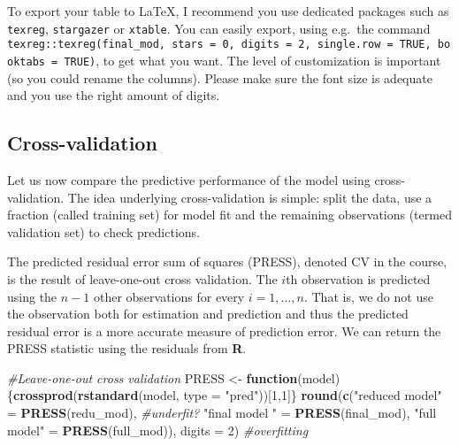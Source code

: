 \documentclass[]{book}
\newenvironment{Shaded}{\begin{snugshade}}{\end{snugshade}}
\newcommand{\CommentTok}[1]{\textcolor[rgb]{0.56,0.35,0.01}{\textit{#1}}}
\newcommand{\ControlFlowTok}[1]{\textcolor[rgb]{0.13,0.29,0.53}{\textbf{#1}}}
\newcommand{\DataTypeTok}[1]{\textcolor[rgb]{0.13,0.29,0.53}{#1}}
\newcommand{\DecValTok}[1]{\textcolor[rgb]{0.00,0.00,0.81}{#1}}
\newcommand{\KeywordTok}[1]{\textcolor[rgb]{0.13,0.29,0.53}{\textbf{#1}}}
\newcommand{\NormalTok}[1]{#1}
\newcommand{\StringTok}[1]{\textcolor[rgb]{0.31,0.60,0.02}{#1}}
\theoremstyle{definition}
\theoremstyle{definition}
\theoremstyle{definition}
\theoremstyle{remark}
\begin{document}
To export your table to \LaTeX, I recommend you use dedicated packages
such as \texttt{texreg}, \texttt{stargazer} or \texttt{xtable}. You can
easily export, using e.g.~the command
\texttt{texreg::texreg(final\_mod,\ stars\ =\ 0,\ digits\ =\ 2,\ single.row\ =\ TRUE,\ booktabs\ =\ TRUE)},
to get what you want. The level of customization is important (so you
could rename the columns). Please make sure the font size is adequate
and you use the right amount of digits.

\hypertarget{cross-validation}{%
\subsection{Cross-validation}\label{cross-validation}}

Let us now compare the predictive performance of the model using
cross-validation. The idea underlying cross-validation is simple: split
the data, use a fraction (called training set) for model fit and the
remaining observations (termed validation set) to check predictions.

The predicted residual error sum of squares (PRESS), denoted
\(\mathrm{CV}\) in the course, is the result of leave-one-out cross
validation. The \(i\)th observation is predicted using the \(n-1\) other
observations for every \(i=1, \ldots, n\). That is, we do not use the
observation both for estimation and prediction and thus the predicted
residual error is a more accurate measure of prediction error. We can
return the PRESS statistic using the residuals from \textbf{R}.

\begin{Shaded}
\begin{Highlighting}[]
\CommentTok{#Leave-one-out cross validation}
\NormalTok{PRESS <-}\StringTok{ }\ControlFlowTok{function}\NormalTok{(model)\{}\KeywordTok{crossprod}\NormalTok{(}\KeywordTok{rstandard}\NormalTok{(model, }\DataTypeTok{type =} \StringTok{"pred"}\NormalTok{))[}\DecValTok{1}\NormalTok{,}\DecValTok{1}\NormalTok{]\}}
\KeywordTok{round}\NormalTok{(}\KeywordTok{c}\NormalTok{(}\StringTok{"reduced model"}\NormalTok{ =}\StringTok{ }\KeywordTok{PRESS}\NormalTok{(redu_mod), }\CommentTok{#underfit?}
        \StringTok{"final model "}\NormalTok{ =}\StringTok{ }\KeywordTok{PRESS}\NormalTok{(final_mod),}
        \StringTok{"full model"}\NormalTok{ =}\StringTok{ }\KeywordTok{PRESS}\NormalTok{(full_mod)),}
  \DataTypeTok{digits =} \DecValTok{2}\NormalTok{) }\CommentTok{#overfitting}
\end{Highlighting}
\end{Shaded}
\end{document}
